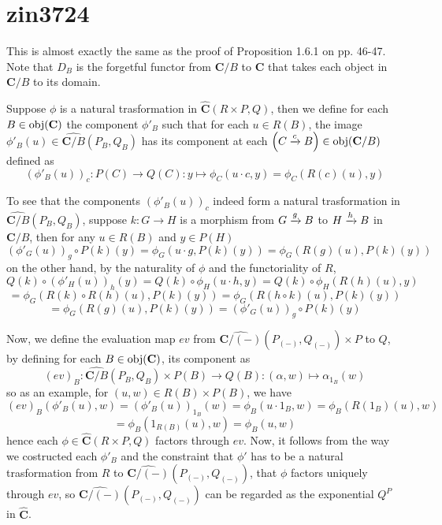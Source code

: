 \section{zin3724}
This is almost exactly the same as the proof of Proposition 1.6.1 on pp. 46-47. Note that $D_B$ is the forgetful functor from $\mathbf C/B$ to $\mathbf C$ that takes each object in $\mathbf C/B$ to its domain.

Suppose $\phi$ is a natural trasformation in $\widehat{\mathbf{C}}(R\times P,Q)$, then we define for each $B\in\operatorname{\operatorname{obj}}(\mathbf C)$ the component $\phi'_B$ such that for each $u\in R(B)$, the image $\phi'_B(u)\in\widehat{\mathbf{C}/B}(P_B,Q_B)$ has its component at each $\left(C\xrightarrow{c}B\right)\in\operatorname{\operatorname{obj}}(\mathbf C/B)$ defined as
\[(\phi'_B(u))_c:P(C)\to Q(C):y\mapsto\phi_C(u\cdot c,y)=\phi_C(R(c)(u),y)\]

To see that the components $(\phi'_B(u))_c$ indeed form a natural trasformation in $\widehat{\mathbf{C}/B}(P_B,Q_B)$, suppose $k:G\to H$ is a morphism from $G\xrightarrow{g}B$ to $H\xrightarrow{h}B$ in $\mathbf{C}/B$, then for any $u\in R(B)$ and $y\in P(H)$
\[(\phi'_G(u))_g\circ P(k)(y)=\phi_G(u\cdot g,P(k)(y))=\phi_G(R(g)(u),P(k)(y))\]
on the other hand, by the naturality of $\phi$ and the functoriality of $R$,
\[Q(k)\circ(\phi'_H(u))_h(y)=Q(k)\circ\phi_H(u\cdot h,y)=Q(k)\circ\phi_H(R(h)(u),y)\]
\[=\phi_G(R(k)\circ R(h)(u),P(k)(y))=\phi_G(R(h\circ k)(u),P(k)(y))\]
\[=\phi_G(R(g)(u),P(k)(y))=(\phi'_G(u))_g\circ P(k)(y)\]

Now, we define the evaluation map $ev$ from $\widehat{\mathbf{C}/(-)}(P_{(-)},Q_{(-)})\times P$ to $Q$, by defining for each $B\in\operatorname{\operatorname{obj}}(\mathbf{C})$, its component as
\[(ev)_B:\widehat{\mathbf{C}/B}(P_B,Q_B)\times P(B)\to Q(B):(\alpha,w)\mapsto\alpha_{1_B}(w)\]
so as an example, for $(u,w)\in R(B)\times P(B)$, we have
\[(ev)_B(\phi'_B(u),w)=(\phi'_B(u))_{1_B}(w)=\phi_B(u\cdot1_B,w)=\phi_B(R(1_B)(u),w)\]
\[=\phi_B(1_{R(B)}(u),w)=\phi_B(u,w)\]
hence each $\phi\in\widehat{\mathbf{C}}(R\times P,Q)$ factors through $ev$. Now, it follows from the way we costructed each $\phi'_B$ and the constraint that $\phi'$ has to be a natural trasformation from $R$ to $\widehat{\mathbf{C}/(-)}(P_{(-)},Q_{(-)})$, that $\phi$ factors uniquely through $ev$, so $\widehat{\mathbf{C}/(-)}(P_{(-)},Q_{(-)})$ can be regarded as the exponential $Q^P$ in $\widehat{\mathbf{C}}$.